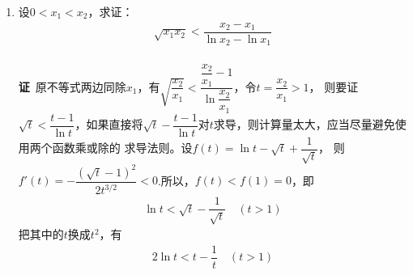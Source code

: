 \begin{enumerate}[label={【\textbf{例\thechapter.\arabic*}】},
 leftmargin=\inteval{\myenumleftmargin}pt,
 itemsep=\inteval{\myenumitempsep}pt,
 itemindent=\inteval{\myenumitemindent}pt]
如果某条直线在$ y $轴上截距小于$ 3-4\ln2 $，则不可能是$ y=f(x) $的切线，而只能与$ y=f(x) $相交，但这样无法判断交点的数量。\\
\\
按照上面的思想，可以编制如下题目：\\
(I)求$ y=f(x)=\dfrac{x}{x^2+1} $的切线在$ y $轴上的截距的取值范围。\\
\textbf{解}\ 令$ \phi(x)=f(x)-xf'(x) $，则
\begin{gather*}
    \phi'(x)=-xf''(x)=\dfrac{2x^2(3-x^2)}{(x^2+1)^3},\ 
\end{gather*}
$ \phi'(\pm\sqrt{3})=0,\ \phi(\pm\sqrt{3})=\pm\dfrac{3\sqrt{3}}{8} $，于是，截距的范围是$ \left[-\dfrac{3\sqrt{3}}{8},\dfrac{3\sqrt{3}}{8}\right] $.对于直线$ y=kx+a $，当$ a $超过切线截距的范围，那么直线与$ y=\dfrac{x}{x^2+1}  $至多有一个交点(作为证明题，读者自行完成)。\\
(II)求$ y=f(x)=\dfrac{x^2}{x^4+1} $的切线在$ y $轴上的截距的取值范围。(计算量较大，可借助软件完成，不适合拿来考试)。\\
\textbf{解}\ 令$ \phi(x)=f(x)-xf'(x) $，则
\begin{gather*}
    \phi'(x)=-xf''(x)=\dfrac{-2x(3x^8-12x^4+1)}{(x^4+1)^3},\q
    \phi'\left(\sqrt[4]{2\pm \dfrac{\sqrt{33}}{3}}\right)=0
\end{gather*}
于是，截距的范围是
\begin{gather*}
    \left[\dfrac{1}{32}(-1-\sqrt{33})\sqrt{18+3\sqrt{33}},\dfrac{1}{32}
    (-1+\sqrt{33})\sqrt{18+3\sqrt{33}}\right]\approx [-0.184504, 0.880086]
\end{gather*}

\item 设$ 0<x_1<x_2 $，求证：
\begin{gather}\label{对数均值不等式左半部分}
	\sqrt{x_1x_2}<\dfrac{x_2-x_1}{\ln x_2-\ln x_1}	
\end{gather} \\
\textbf{证}\ 原不等式两边同除$ x_1 $，有$ \sqrt{\dfrac{x_2}{x_1}}<
\dfrac{\dfrac{x_2}{x_1}-1}{\ln\dfrac{x_2}{x_1}} $，令$ t=\dfrac{x_2}{x_1}>1 $，
则要证$ \sqrt{t}<\dfrac{t-1}{\ln t} $，如果直接将$ \sqrt{t}-
\dfrac{t-1}{\ln t}$对$ t $求导，则计算量太大，应当尽量避免使用两个函数乘或除的
求导法则。设$ f(t)=\ln t-\sqrt{t}+\dfrac{1}{\sqrt{t}}$，
则$ f'(t)=-\dfrac{(\sqrt{t}-1)^2}{2t^{3/2}}<0 $.所以，$ f(t)<f(1)=0 $，即
\begin{align}\label{lnt<sqrt(t)-1/sqrt(t)}
	\ln t<\sqrt{t}-\dfrac{1}{\sqrt{t}} \quad (t>1)
\end{align}
把其中的$ t $换成$ t^2 $，有
\begin{gather}\label{不等式2lnt<t-1/t}
	 2\ln t<t-\dfrac{1}{t}\quad (t>1) 
\end{gather}


\end{enumerate}
